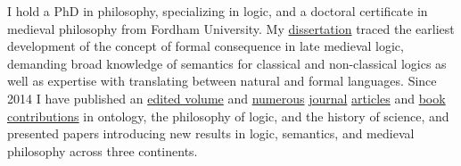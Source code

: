 I hold a PhD in philosophy, specializing in logic, and a doctoral certificate in medieval philosophy from Fordham University. 
My \href{https://www.academia.edu/32939933/The_development_of_the_medieval_Parisian_account_of_formal_consequence}{dissertation} traced the earliest development of the concept of formal consequence
in late medieval logic, demanding 
broad knowledge 
of semantics for classical and non-classical logics 
as well as  
expertise with translating between natural and formal languages. 
Since 2014 I have published an \href{https://brill.com/view/journals/viv/56/3-4/viv.56.issue-3-4.xml?language=en}{edited volume} and  
\href{https://link.springer.com/article/10.1007/s11787-019-00229-x}{numerous} \href{https://link.springer.com/article/10.1007/s11787-017-0162-7}{journal} \href{https://www.jstor.org/stable/43658430}{articles} and  \href{https://www.cambridgescholars.com/download/sample/64716}{book} \href{http://www.collegepublications.co.uk/dialogues/?00005}{contributions}
in 
ontology, 
the philosophy of logic, 
and the history of science, 
and presented papers introducing new results in logic, semantics, and medieval philosophy across three continents.
